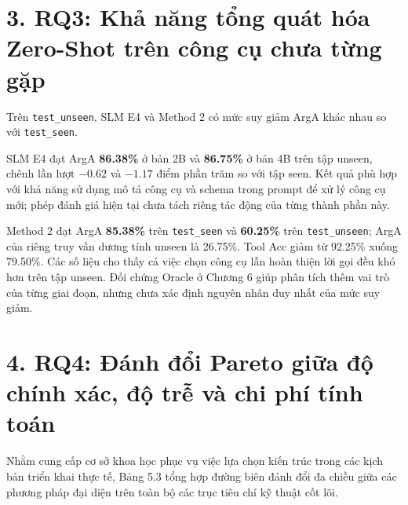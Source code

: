 \section{3. RQ3: Khả năng tổng quát hóa Zero-Shot trên công cụ chưa từng gặp}

Trên \texttt{test_unseen}, SLM E4 và Method 2 có mức suy giảm ArgA khác nhau so với \texttt{test_seen}.

SLM E4 đạt ArgA \textbf{86.38\%} ở bản 2B và \textbf{86.75\%} ở bản 4B trên tập unseen, chênh lần lượt $-0.62$ và $-1.17$ điểm phần trăm so với tập seen. Kết quả phù hợp với khả năng sử dụng mô tả công cụ và schema trong prompt để xử lý công cụ mới; phép đánh giá hiện tại chưa tách riêng tác động của từng thành phần này.

Method 2 đạt ArgA \textbf{85.38\%} trên \texttt{test_seen} và \textbf{60.25\%} trên \texttt{test_unseen}; ArgA của riêng truy vấn dương tính unseen là 26.75\%. Tool Acc giảm từ 92.25\% xuống 79.50\%. Các số liệu cho thấy cả việc chọn công cụ lẫn hoàn thiện lời gọi đều khó hơn trên tập unseen. Đối chứng Oracle ở Chương 6 giúp phân tích thêm vai trò của từng giai đoạn, nhưng chưa xác định nguyên nhân duy nhất của mức suy giảm.

\section{4. RQ4: Đánh đổi Pareto giữa độ chính xác, độ trễ và chi phí tính toán}

Nhằm cung cấp cơ sở khoa học phục vụ việc lựa chọn kiến trúc trong các kịch bản triển khai thực tế, Bảng 5.3 tổng hợp đường biên đánh đổi đa chiều giữa các phương pháp đại diện trên toàn bộ các trục tiêu chí kỹ thuật cốt lõi.


